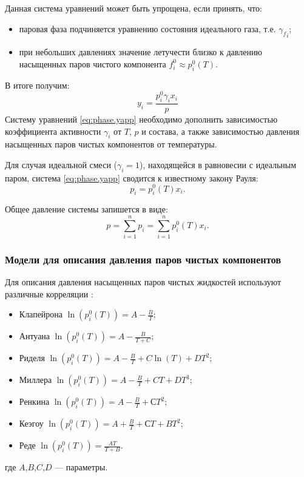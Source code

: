 Данная система уравнений может быть упрощена, если принять, что:
\begin{itemize}
	\item паровая фаза подчиняется  уравнению состояния идеального газа, т.е. ${\gamma_f}_i$;
	\item при небольших давлениях значение летучести близко к давлению насыщенных паров чистого компонента $f_i^0 \approx p^0_i (T)$.
\end{itemize}
В итоге получим:
\begin{equation} \label{eq:phase.yapp}
y_i=\dfrac{p_i^0 \gamma_i x_i}{ p}
\end{equation}
Систему уравнений \eqref{eq:phase.yapp} необходимо дополнить зависимостью коэффициента активности $\gamma_i$ от $T$, $p$ и состава, а также зависимостью давления насыщенных паров чистых компонентов от температуры. 

Для случая идеальной смеси ($\gamma_i=1$), находящейся в равновесии с идеальным паром, система \eqref{eq:phase.yapp} сводится к известному закону Рауля:
\begin{equation}
	p_i=p_i^0(T) x_i.
\end{equation}

Общее давление системы запишется в виде:
\begin{equation}\label{eq.phase.sump}
	p=\sum\limits_{i=1}^{n} p_i=  \sum\limits_{i=1}^{n} p_i^0 (T) x_i.
\end{equation}

\subsubsection{Модели для описания давления паров чистых компонентов}


Для описания давления насыщенных паров чистых жидкостей используют различные корреляции \cite{yelles1989,rid1982}:
\begin{itemize}
	\item Клапейрона $\ln(p_i^0(T))=A-\frac{B}{T}$;
	\item Антуана $\ln(p_i^0(T))=A-\frac{B}{T+C}$;
	\item Риделя $\ln(p_i^0(T))=A-\frac{B}{T}+C \ln(T)+D T^2$;
	\item Миллера $\ln(p_i^0(T))=A-\frac{B}{T}+C T+D T^3$;
	\item Ренкина $\ln(p_i^0(T))=A-\frac{B}{T}+С T^2$;
	\item Кеэгоу $\ln(p_i^0(T))=A+\frac{B}{T}+С T+BT^2$;
	\item Реде $\ln(p_i^0(T))=\frac{AT}{T+B}$.
\end{itemize}
где $A$,$B$,$C$,$D$ --- параметры.

